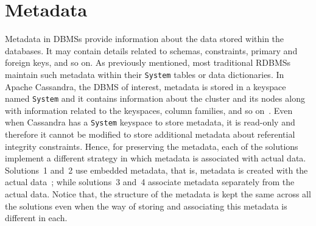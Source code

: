 \section{Metadata}\label{s:design-Metadata}
Metadata in \acp{DBMS} provide information about the data stored within the
databases.
It may contain details related to schemas, constraints,  primary and foreign
keys, and so on.   As previously mentioned,  most traditional \acp{RDBMS}
maintain such metadata within their \texttt{System}  tables or data
dictionaries.
In Apache Cassandra, the \ac{DBMS} of interest, metadata is stored in a keyspace
named \texttt{System} and it contains information about the cluster and its
nodes along with information related to the keyspaces, column families, and so
on~\citep{BOOK}.
 Even when Cassandra has a  \texttt{System} keyspace to store metadata, it is
 read-only and therefore it cannot be modified to store additional metadata
 about referential integrity constraints.
Hence,  for preserving the metadata, each of the solutions implement a 
different strategy in which metadata is associated with actual data. Solutions~1
and~2 use embedded metadata, that is, metadata is created with the actual
data~\citep{duval}; while solutions~3 and~4 associate metadata separately from
the actual data.  Notice that, the structure of the metadata is kept the same across all the solutions even when  the way of
 storing and associating this metadata is different in each.

